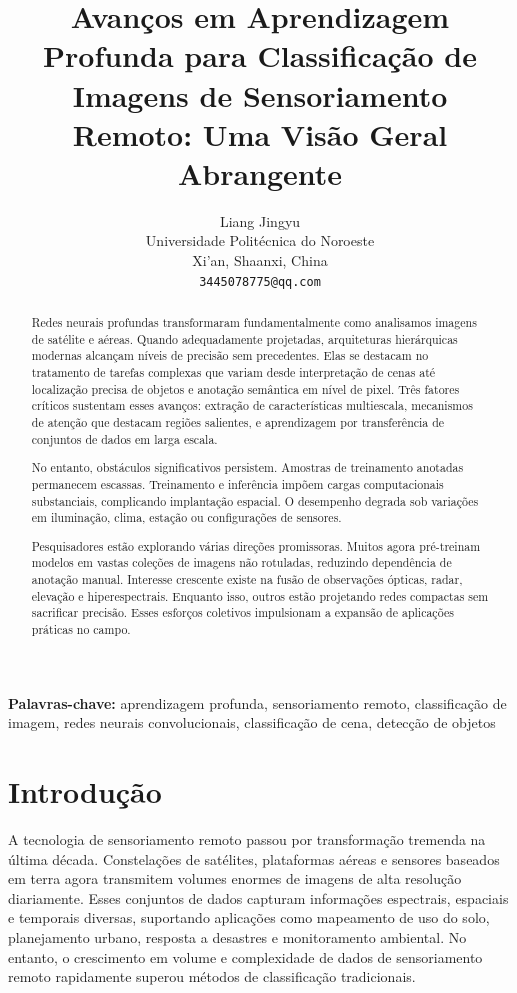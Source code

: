 \documentclass[12pt,a4paper]{article}
\title{\fontsize{14}{17}\selectfont\textbf{Avanços em Aprendizagem Profunda para Classificação de Imagens de Sensoriamento Remoto: Uma Visão Geral Abrangente}}
\author{Liang Jingyu\\
        Universidade Politécnica do Noroeste\\
        Xi'an, Shaanxi, China\\
        \texttt{3445078775@qq.com}}
\date{}
\begin{document}
\maketitle

\begin{abstract}
Redes neurais profundas transformaram fundamentalmente como analisamos imagens de satélite e aéreas. Quando adequadamente projetadas, arquiteturas hierárquicas modernas alcançam níveis de precisão sem precedentes. Elas se destacam no tratamento de tarefas complexas que variam desde interpretação de cenas até localização precisa de objetos e anotação semântica em nível de pixel. Três fatores críticos sustentam esses avanços: extração de características multiescala, mecanismos de atenção que destacam regiões salientes, e aprendizagem por transferência de conjuntos de dados em larga escala.

No entanto, obstáculos significativos persistem. Amostras de treinamento anotadas permanecem escassas. Treinamento e inferência impõem cargas computacionais substanciais, complicando implantação espacial. O desempenho degrada sob variações em iluminação, clima, estação ou configurações de sensores.

Pesquisadores estão explorando várias direções promissoras. Muitos agora pré-treinam modelos em vastas coleções de imagens não rotuladas, reduzindo dependência de anotação manual. Interesse crescente existe na fusão de observações ópticas, radar, elevação e hiperespectrais. Enquanto isso, outros estão projetando redes compactas sem sacrificar precisão. Esses esforços coletivos impulsionam a expansão de aplicações práticas no campo.
\end{abstract}

\textbf{Palavras-chave:} aprendizagem profunda, sensoriamento remoto, classificação de imagem, redes neurais convolucionais, classificação de cena, detecção de objetos

\section{Introdução}
\label{sec:introduction}
A tecnologia de sensoriamento remoto passou por transformação tremenda na última década. Constelações de satélites, plataformas aéreas e sensores baseados em terra agora transmitem volumes enormes de imagens de alta resolução diariamente. Esses conjuntos de dados capturam informações espectrais, espaciais e temporais diversas, suportando aplicações como mapeamento de uso do solo, planejamento urbano, resposta a desastres e monitoramento ambiental. No entanto, o crescimento em volume e complexidade de dados de sensoriamento remoto rapidamente superou métodos de classificação tradicionais.
\end{document}

